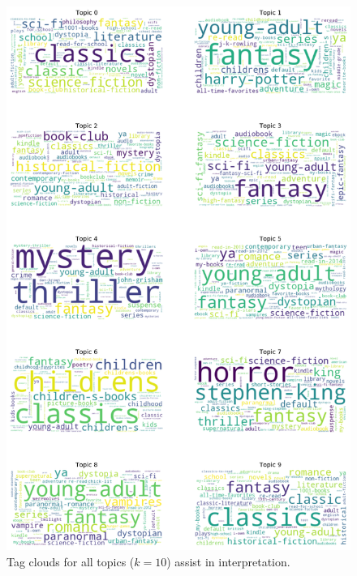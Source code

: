 \documentclass[11pt]{article}
\begin{document}
\begin{figure}[p]
    \centering
    \includegraphics[height=0.9\textheight]{../image/goodreads-topics-profiles-recommendations/tag-cloud-10.png}
    \caption[Tag Clouds ($k=10$)]{Tag clouds for all topics ($k=10$) assist in interpretation.}
     \label{fig:tag-cloud-10}
\end{figure}
\end{document}
